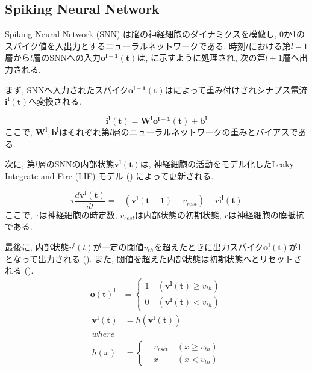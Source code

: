 \makeatletter %
\subsection{Spiking Neural Network}
Spiking Neural Network (SNN) は脳の神経細胞のダイナミクスを模倣し, 0か1のスパイク値を入出力とするニューラルネットワークである.
時刻$t$における第$l-1$層から$l$層のSNNへの入力$\bm{o^{l-1}(t)}$は, に示すように処理され, 次の第$l+1$層へ出力される.



まず, SNNへ入力されたスパイク$\bm{o^{l-1}(t)}$はによって重み付けされシナプス電流$\bm{i^l(t)}$へ変換される.

\begin{equation}
    \bm{i^l(t)} = \bm{W^l}\bm{o^{l-1}(t)} + \bm{b^l}
    \label{eq:input_spike}
\end{equation}
ここで, $\bm{W^l}, \bm{b^l}$はそれぞれ第$l$層のニューラルネットワークの重みとバイアスである.

次に, 第$l$層のSNNの内部状態$\bm{v^l(t)}$は, 神経細胞の活動をモデル化したLeaky Integrate-and-Fire (LIF) モデル () によって更新される.

\begin{equation}
    {\tau}\frac{d\bm{v^l(t)}}{dt}=-(\bm{v^l({t-1})}-v_{rest})+r\bm{i^l(t)}
    \label{eq:lif}
\end{equation}
ここで, $\tau$は神経細胞の時定数, $v_{rest}$は内部状態の初期状態, $r$は神経細胞の膜抵抗である.

最後に, 内部状態$v^l(t)$が一定の閾値$v_{th}$を超えたときに出力スパイク$\bm{o^l(t)}$が1となって出力される ().
また, 閾値を超えた内部状態は初期状態へとリセットされる ().
\begin{equation}
    \begin{split}
      \bm{o(t)^{l}}&=\left\{
        \begin{alignedat}{2}
          1 &\:(\bm{v^l(t)}{\geq}v_{th})\\
          0 &\:(\bm{v^l(t)}{<}v_{th})
        \end{alignedat}
      \right. 
    \end{split} \label{eq:outputSpike}
  \end{equation}
  \begin{equation}
    \begin{split}
      \bm{v^l(t)}&=h(\bm{v^l(t)})\\
    where\\
    h(x)&=\left\{
      \begin{alignedat}{2}
        &v_{rset} &\:(x{\geq}v_{th})\\
        &x &\:(x{<}v_{th})
      \end{alignedat}
    \right. 
    \end{split} \label{eq:outputSpike2}
  \end{equation}
